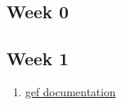 \documentclass[12pt,letterpaper]{article}
\begin{document}
	\subsection*{Week 0}

	\subsection*{Week 1}
	\begin{enumerate}
		\item \href{https://gef.readthedocs.io/en/master/}{gef documentation}
	\end{enumerate}
\end{document}
